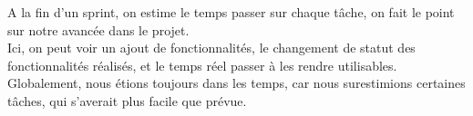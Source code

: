 A la fin d'un sprint, on estime le temps passer sur chaque tâche, on fait le point sur notre avancée dans le projet.\\Ici, on peut voir un ajout de fonctionnalités, le changement de statut des fonctionnalités réalisés, et le temps réel passer à les rendre utilisables.
Globalement, nous étions toujours dans les temps, car nous surestimions certaines tâches, qui s'averait plus facile que prévue.


